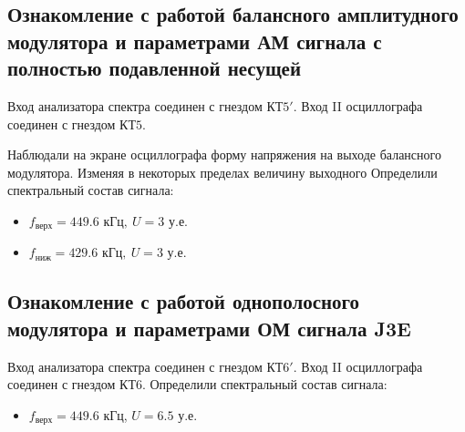 \subsection{Ознакомление с работой балансного амплитудного модулятора и параметрами АМ сигнала с полностью подавленной несущей}

Вход анализатора спектра соединен с гнездом $\text{КТ}5'$. Вход II осциллографа соединен с гнездом $\text{КТ}5$.

Наблюдали на экране осциллографа форму напряжения на выходе
балансного модулятора. Изменяя в некоторых пределах величину выходного
Определили спектральный состав сигнала:
\begin{itemize}
	\item $f_{\text{верх}}=449.6 \text{ кГц}, ~ U= 3 \text{ у.е.} $
	\item $f_{\text{ниж}}=429.6 \text{ кГц}, ~ U= 3 \text{ у.е.} $
\end{itemize}



\subsection{Ознакомление с работой однополосного модулятора и параметрами ОМ сигнала J3E}
Вход анализатора спектра соединен с гнездом $\text{КТ}6'$. Вход II осциллографа соединен с гнездом $\text{КТ}6$.
Определили спектральный состав сигнала:
\begin{itemize}
	\item $f_{\text{верх}}=449.6$ кГц, $U=6.5$ у.е.
\end{itemize}

